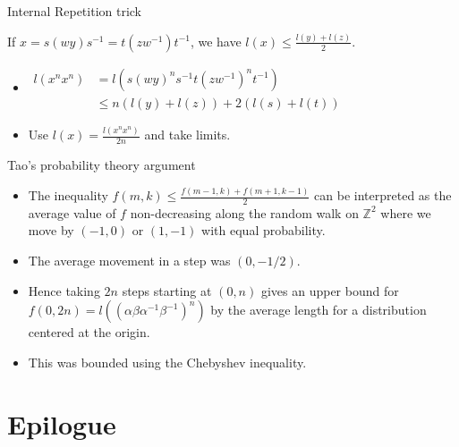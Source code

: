 \documentclass[aspectratio=1610,17pt, ucs]{beamer}
\newcommand{\Z}{\mathbb{Z}}
\begin{document}
\begin{frame}{Internal Repetition trick}
  \begin{lemma}
    If $x = s(wy)s^{-1} = t(zw^{-1})t^{-1}$, we have $l(x)\leq \frac{l(y)+ l(z)}{2}$.
  \end{lemma}
  \pause
      \begin{itemize}[<+->]
        \item $\begin{aligned}
          l(x^nx^n) &= l(s(wy)^ns^{-1}t(zw^{-1})^nt^{-1}) \\ 
          &\leq n(l(y) +l(z)) + 2(l(s) + l(t))
        \end{aligned}$
      \begin{center}      
      \end{center}
      \item Use $l(x) = \frac{l(x^nx^n)}{2n}$ and take limits.
      \end{itemize}
    
\end{frame}

\begin{frame}{Tao's probability theory argument}
  \begin{itemize}[<+->]
    
    \item The inequality $f(m,k)\leq \frac{f(m-1,k)+f(m+1,k-1)}{2}$ can be interpreted as the average value of $f$ non-decreasing along the random walk on $\Z^2$ where we move by $(-1, 0)$ or $(1, -1)$ with equal probability. 
    \item The average movement in a step was $(0, -1/2)$.
    \item Hence taking $2n$ steps starting at $(0, n)$ gives an upper bound for $f(0, 2n)=l((\alpha\beta\alpha^{-1}\beta^{-1})^n)$ by the average length for a distribution centered at the origin. 
    \item This was bounded using the Chebyshev inequality.
    
    
  \end{itemize}
\end{frame}

\section{Epilogue}
\end{document}
